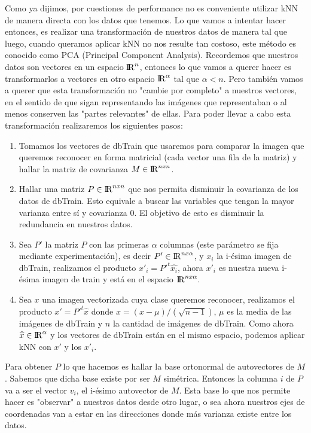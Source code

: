 \par Como ya dijimos, por cuestiones de performance no es conveniente utilizar kNN de manera directa con los datos que tenemos. Lo que vamos a intentar hacer entonces, es realizar una transformación de nuestros datos de manera tal que luego, cuando queramos aplicar kNN no nos resulte tan costoso, este método es conocido como PCA (Principal Component Analysis). Recordemos que nuestros datos son vectores en un espacio ${\rm I\!R}^n$, entonces lo que vamos a querer hacer es transformarlos a vectores en otro espacio ${\rm I\!R}^\alpha$ tal que $\alpha < n$. Pero también vamos a querer que esta transformación no "cambie por completo" a nuestros vectores, en el sentido de que sigan representando las imágenes que representaban o al menos conserven las "partes relevantes" de ellas. Para poder llevar a cabo esta transformación realizaremos los siguientes pasos:

\begin{enumerate}
\item Tomamos los vectores de dbTrain que usaremos para comparar la imagen que queremos reconocer en forma matricial (cada vector una fila de la matriz) y hallar la matriz de covarianza $M \in {\rm I\!R}^{nxn}$.
\item Hallar una matriz $P \in {\rm I\!R}^{nxn}$ que nos permita disminuir la covarianza de los datos de dbTrain. Esto equivale a buscar las variables que tengan la mayor varianza entre sí y covarianza 0. El objetivo de esto es disminuir la redundancia en nuestros datos.
\item Sea $P'$ la matriz $P$ con las primeras $\alpha$ columnas (este parámetro se fija mediante experimentación), es decir $P' \in {\rm I\!R}^{nx\alpha}$, y $x_i$ la i-ésima imagen de dbTrain, realizamos el producto $x'_i = P'^t \widehat{x_i}$, ahora $x'_i$ es nuestra nueva i-ésima imagen de train y está en el espacio ${\rm I\!R}^{nx\alpha}$.
\item Sea $x$ una imagen vectorizada cuya clase queremos reconocer, realizamos el producto $x'= P'^t\widehat{x}$ donde $\widehat{x} = (x - \mu) / (\sqrt{n - 1})$, $\mu$ es la media de las imágenes de dbTrain y $n$ la cantidad de imágenes de dbTrain. Como ahora $\widehat{x} \in {\rm I\!R}^{\alpha}$ y los vectores de dbTrain están en el mismo espacio, podemos aplicar kNN con $x'$ y los $x'_i$.
\end{enumerate}

Para obtener $P$ lo que hacemos es hallar la base ortonormal de autovectores de $M$. Sabemos que dicha base existe por ser $M$ simétrica. Entonces la columna $i$ de $P$ va a ser el vector $v_i$, el i-ésimo autovector de $M$. Esta base lo que nos permite hacer es "observar" a nuestros datos desde otro lugar, o sea ahora nuestros ejes de coordenadas van a estar en las direcciones donde más varianza existe entre los datos.


